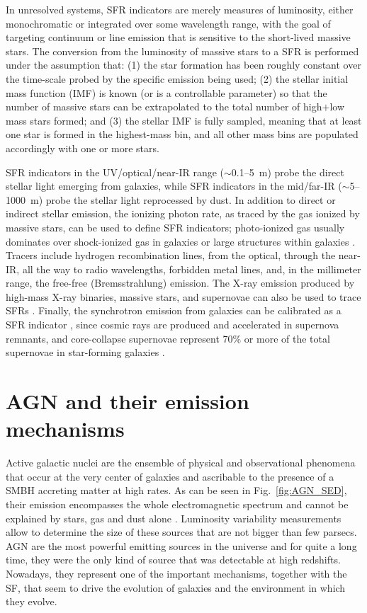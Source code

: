 In unresolved systems, SFR indicators are merely measures of luminosity, either monochromatic or integrated over some wavelength range, with the goal of targeting continuum or line emission that is sensitive to the short-lived massive stars. The conversion from the luminosity of massive stars to a SFR is performed under the assumption that: (1) the star formation has been roughly constant over the time-scale probed by the specific emission being used; (2) the stellar initial mass function (IMF) is known (or is a controllable parameter) so that the number of massive stars can be extrapolated to the total number of high$+$low mass stars formed; and (3) the stellar IMF is fully sampled, meaning that at least one star is formed in the highest-mass bin, and all other mass bins are populated accordingly with one or more stars.

SFR indicators in the UV/optical/near-IR range ($\sim$0.1--5~\textmu m) probe the direct stellar light emerging from galaxies, while SFR indicators in the mid/far-IR ($\sim$5--1000~\textmu m) probe the stellar light reprocessed by dust. In addition to direct or indirect stellar emission, the ionizing photon rate, as traced by the gas ionized by massive stars, can be used to define SFR indicators; photo-ionized gas usually dominates over shock-ionized gas in galaxies or large structures within galaxies \citep[e.g.,][]{2004AJ....127.1405C,2011ApJ...731...45H}. Tracers include hydrogen recombination lines, from the optical, through the near-IR, all the way to radio wavelengths, forbidden metal lines, and, in the millimeter range, the free-free (Bremsstrahlung) emission. The X-ray emission produced by high-mass X-ray binaries, massive stars, and supernovae can also be used to trace SFRs \citep{2017MNRAS.465.3390A}. Finally, the synchrotron emission from galaxies can be calibrated as a SFR indicator \citep{1992ARA&A..30..575C}, since cosmic rays are produced and accelerated in supernova remnants, and core-collapse supernovae represent 70\% or more of the total supernovae in star-forming galaxies \citep{2009A&A...503..137B}.

\section{AGN and their emission mechanisms}
Active galactic nuclei are the ensemble of physical and observational phenomena that occur at the very center of galaxies and ascribable to the presence of a SMBH accreting matter at high rates. As can be seen in Fig.~\ref{fig:AGN_SED}, their emission encompasses the whole electromagnetic spectrum and cannot be explained by stars, gas and dust alone%
. Luminosity variability measurements allow to determine the size of these sources that are not bigger than few parsecs. AGN are the most powerful emitting sources in the universe and for quite a long time, they were the only kind of source that was detectable at high redshifts. Nowadays, they represent one of the important mechanisms, together with the SF, that seem to drive the evolution of galaxies and the environment in which they evolve.

